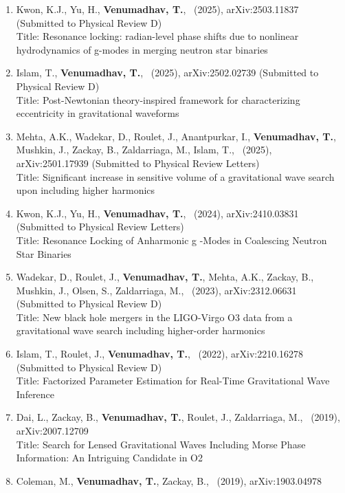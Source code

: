 \documentclass{article}
\newlength{\cvindent}
\newenvironment{cvlist}{%
  \begin{list}{}{%
    \setlength{\leftmargin}{\cvindent}%
    \setlength{\rightmargin}{0pt}%
    \setlength{\topsep}{0pt}%
    \setlength{\partopsep}{0pt}%
    \setlength{\parsep}{0pt}%
    \setlength{\itemsep}{0pt}%
  }%
  \item\relax
}{%
  \end{list}
}
\begin{document}
\begin{cvlist}
\begin{enumerate}
	      Title: gwharmone: first data-driven surrogate for eccentric harmonics in binary black hole merger waveforms
	      \item Kwon, K.J., Yu, H., \textbf{Venumadhav, T.}, \ (2025), arXiv:2503.11837 (Submitted to Physical Review D) \\
	      Title: Resonance locking: radian-level phase shifts due to nonlinear hydrodynamics of  g-modes in merging neutron star binaries
	      \item Islam, T., \textbf{Venumadhav, T.}, \ (2025), arXiv:2502.02739 (Submitted to Physical Review D) \\
	      Title: Post-Newtonian theory-inspired framework for characterizing eccentricity in gravitational waveforms
	      \item Mehta, A.K., Wadekar, D., Roulet, J., Anantpurkar, I., \textbf{Venumadhav, T.}, Mushkin, J., Zackay, B., Zaldarriaga, M., Islam, T., \ (2025), arXiv:2501.17939 (Submitted to Physical Review Letters) \\	      
	      Title: Significant increase in sensitive volume of a gravitational wave search upon including higher harmonics
	      \item Kwon, K.J., Yu, H., \textbf{Venumadhav, T.}, \ (2024), arXiv:2410.03831 (Submitted to Physical Review Letters) \\
	      Title: Resonance Locking of Anharmonic g -Modes in Coalescing Neutron Star Binaries
	      \item Wadekar, D., Roulet, J., \textbf{Venumadhav, T.}, Mehta, A.K., Zackay, B., Mushkin, J., Olsen, S., Zaldarriaga, M., \ (2023), arXiv:2312.06631 (Submitted to Physical Review D) \\
	      Title: New black hole mergers in the LIGO-Virgo O3 data from a gravitational wave search including higher-order harmonics
	      \item Islam, T., Roulet, J., \textbf{Venumadhav, T.}, \ (2022), arXiv:2210.16278 (Submitted to Physical Review D) \\
	      Title: Factorized Parameter Estimation for Real-Time Gravitational Wave Inference
	      \item Dai, L., Zackay, B., \textbf{Venumadhav, T.}, Roulet, J., Zaldarriaga, M., \ (2019), arXiv:2007.12709 \\
	      Title: Search for Lensed Gravitational Waves Including Morse Phase Information: An Intriguing Candidate in O2
	      \item Coleman, M., \textbf{Venumadhav, T.}, Zackay, B., \ (2019), arXiv:1903.04978 \\

\end{enumerate}
\end{cvlist}
\end{document}

